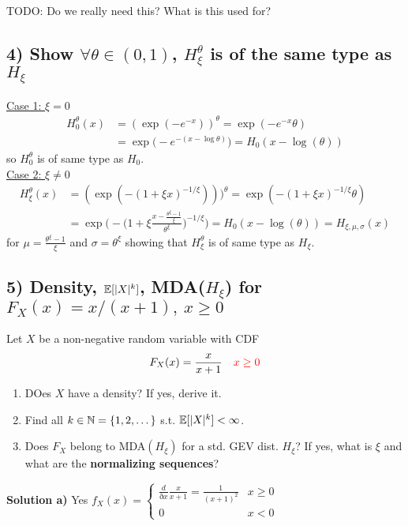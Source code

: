 TODO: Do we really need this? What is this used for?

%
%
\subsection*{4) Show $\forall \theta\in(0,1)$, $H_\xi^\theta$ is of the same type as $H_\xi$}
\underline{Case 1: $\xi=0$}
\begin{align*}
    H_0^\theta(x) &= (\exp(-e^{-x}))^\theta = \exp(-e^{-x}\theta) \\
    &= \exp\bigg(-e^{-(x-\log\theta)}\bigg) = H_0(x - \log(\theta))
\end{align*}
so $H_0^\theta$ is of same type as $H_0$. \\

\underline{Case 2: $\xi \neq 0$}
\begin{align*}
    H_\xi^\theta(x) &= (\exp( -(1+\xi x)^{-1/\xi}) ))^\theta = \exp(-(1+\xi x)^{-1/\xi}\theta) \\
    &= \exp\bigg( -\bigg(1 + \xi \frac{x - \frac{\theta^\xi - 1}{\xi}}{\theta^\xi}\bigg)^{-1/\xi} \bigg) = H_0(x - \log(\theta))
    = H_{\xi,\mu,\sigma}(x)
\end{align*}
for $\mu = \frac{\theta^\xi - 1}{\xi}$ and $\sigma = \theta^\xi$ showing that $H_\xi^\theta$ is of same type as $H_\xi$.

%
%
\subsection*{5) Density, $\mathbb{E}[|X|^k]$, MDA($H_\xi$) for $F_X(x) = x / (x+1), \ x\geq 0$}
Let $X$ be a non-negative random variable with CDF
\[
    F_X(x) = \frac{x}{x+1} \quad \textcolor{red}{x\geq 0}
\]
\begin{enumerate}[label=(\alph*)]
    \item DOes $X$ have a density? If yes, derive it.
    \item Find all $k\in\mathbb{N} = \{1,2,\dots\}$ s.t. $\mathbb{E}[|X|^k] < \infty$.
    \item Does $F_X$ belong to MDA$(H_\xi)$ for a std. GEV dist. $H_\xi$? If yes, what is $\xi$ and what are the \textbf{normalizing sequences}?
\end{enumerate}
\textbf{Solution a)} Yes
$
    f_X(x) =
    \begin{cases}
        \frac{d}{ðx}\frac{x}{x+1} = \frac{1}{(x+1)^2} & x\geq 0 \\
        0 & x < 0
    \end{cases}
$

